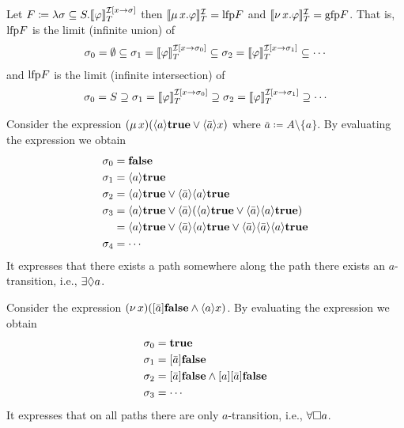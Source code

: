 \begin{remark}
        Let $F\coloneqq \lambda \sigma \subseteq S.\llbracket \varphi \rrbracket_T^{\mathcal{I}[x \to \sigma]}$ then
    $\llbracket \mu\, x. \varphi \rrbracket_T^{\mathcal{I}} = \mathrm{lfp} F$ and $\llbracket \nu\, x. \varphi \rrbracket_T^{\mathcal{I}} = \mathrm{gfp} F$.
    That is, $\mathrm{lfp} F$ is the limit (infinite union) of 
    \begin{align*}
        \sigma_0 = \emptyset 
        \subseteq \sigma_1 = \llbracket \varphi \rrbracket_T^{\mathcal{I}[x \to \sigma_0]}
        \subseteq  \sigma_2 = \llbracket \varphi \rrbracket_T^{\mathcal{I}[x \to \sigma_1]} 
        \subseteq \cdots
    \end{align*}
    and $\mathrm{lfp} F$ is the limit (infinite intersection) of 
    \begin{align*}
        \sigma_0 = S
        \supseteq \sigma_1 = \llbracket \varphi \rrbracket_T^{\mathcal{I}[x \to \sigma_0]}
        \supseteq  \sigma_2 = \llbracket \varphi \rrbracket_T^{\mathcal{I}[x \to \sigma_1]} 
        \supseteq \cdots
    \end{align*}
\end{remark}

\begin{example}
    Consider the expression $(\mu\, x)(\langle a \rangle \mathbf{true} \lor \langle \bar{a} \rangle x)$ where $\bar{a}\coloneqq A\setminus \{a\}$. By evaluating the expression we obtain
    \begin{align*}
        \sigma_0 &= \mathbf{false} \\
        \sigma_1 &= \langle a \rangle\mathbf{true} \\
        \sigma_2 &= \langle a \rangle\mathbf{true}  \lor \langle \bar{a} \rangle\langle a \rangle\mathbf{true} \\
        \sigma_3 &= \langle a \rangle\mathbf{true}  \lor \langle \bar{a} \rangle (\langle a \rangle\mathbf{true}  \lor \langle \bar{a} \rangle\langle a \rangle\mathbf{true})\\
        &= \langle a \rangle\mathbf{true}  \lor \langle \bar{a} \rangle\langle a \rangle\mathbf{true} \lor \langle \bar{a} \rangle\langle \bar{a} \rangle\langle a \rangle\mathbf{true}\\
        \sigma_4 &= \cdots
    \end{align*}
    It expresses that 
    there exists a path somewhere along the path there exists an $a$-transition, i.e., $\exists \lozenge a$. 
\end{example}

\begin{example}
    Consider the expression $(\nu\, x)([ \bar{a} ] \mathbf{false} \land \langle a \rangle x)$. By evaluating the expression we obtain
    \begin{align*}
        \sigma_0 &= \mathbf{true} \\
        \sigma_1 &= [ \bar{a} ]\mathbf{false} \\
        \sigma_2 &= [ \bar{a} ]\mathbf{false} \land [ a ][ \bar{a} ]\mathbf{false} \\
        \sigma_3 &= \cdots
    \end{align*}
    It expresses that 
    on all paths there are only $a$-transition, i.e., $\forall \square a$. 
\end{example}

